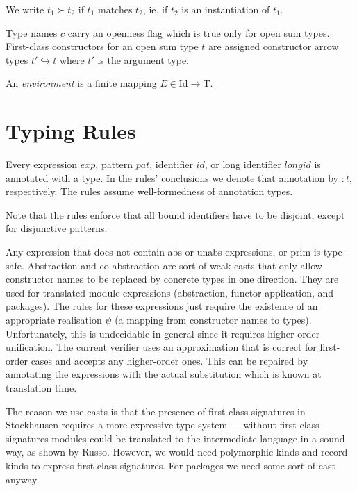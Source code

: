 \documentclass[twoside]{article}
\newcommand{\conarrow}{\hookrightarrow}
\newcommand{\x}[1]{\mathit{#1}}
\newcommand{\f}[1]{\mbox{#1}}
\newcommand{\id}{\x{id}}
\newcommand{\longid}{\x{longid}}
\renewcommand{\exp}{\x{exp}}
\newcommand{\pat}{\x{pat}}
\begin{document}
We write $t_1 \succ t_2$ if $t_1$ matches $t_2$, ie. if $t_2$ is an instantiation of $t_1$.

Type names $c$ carry an openness flag which is true only for open sum types. First-class constructors for an open sum type $t$ are assigned constructor arrow types $t' \conarrow t$ where $t'$ is the argument type.

An {\em environment} is a finite mapping $E \in \f{Id}\to\f{T}$.


\section{Typing Rules}
\label{typing}

Every expression $\exp$, pattern $\pat$, identifier $\id$, or long identifier $\longid$ is annotated with a type. In the rules' conclusions we denote that annotation by $:t$, respectively. The rules assume well-formedness of annotation types.

Note that the rules enforce that all bound identifiers have to be disjoint, except for disjunctive patterns.

Any expression that does not contain \f{abs} or \f{unabs} expressions, or \f{prim} is type-safe. Abstraction and co-abstraction are sort of weak casts that only allow constructor names to be replaced by concrete types in one direction. They are used for translated module expressions (abstraction, functor application, and packages). The rules for these expressions just require the existence of an appropriate realisation $\psi$ (a mapping from constructor names to types). Unfortunately, this is undecidable in general since it requires higher-order unification. The current verifier uses an approximation that is correct for first-order cases and accepts any higher-order ones. This can be repaired by annotating the expressions with the actual substitution which is known at translation time.

The reason we use casts is that the presence of first-class signatures in Stockhausen requires a more expressive type system --- without first-class signatures modules could be translated to the intermediate language in a sound way, as shown by Russo. However, we would need polymorphic kinds and record kinds to express first-class signatures. For packages we need some sort of cast anyway.
\end{document}
